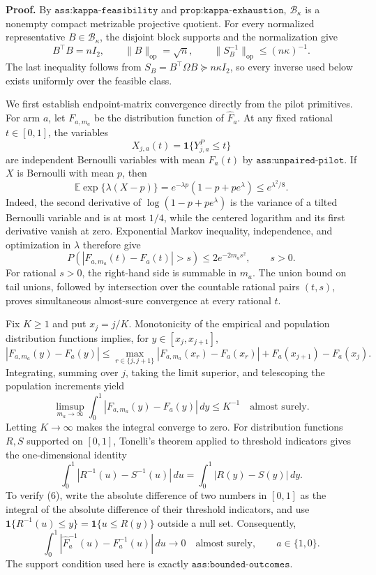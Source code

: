 \textbf{Proof.}
By \(\texttt{ass:kappa-feasibility}\) and \(\texttt{prop:kappa-exhaustion}\), \(\mathcal B_\kappa\) is a nonempty compact metrizable projective quotient.  For every normalized representative \(B\in\mathcal B_\kappa\), the disjoint block supports and the normalization give
\[
B^{\top}B=nI_2,
\qquad
\lVert B\rVert_{\mathrm{op}}=\sqrt n,
\qquad
\lVert S_B^{-1}\rVert_{\mathrm{op}}\le (n\kappa)^{-1}.
\tag{1}
\]
The last inequality follows from \(S_B=B^{\top}\Omega B\succeq n\kappa I_2\), so every inverse used below exists uniformly over the feasible class.

We first establish endpoint-matrix convergence directly from the pilot primitives.  For arm \(a\), let \(F_{a,m_a}\) be the distribution function of \(\widehat F_a\).  At any fixed rational \(t\in[0,1]\), the variables
\[
X_{j,a}(t)=\mathbf 1\{Y^P_{j,a}\le t\}
\]
are independent Bernoulli variables with mean \(F_a(t)\) by \(\texttt{ass:unpaired-pilot}\).  If \(X\) is Bernoulli with mean \(p\), then
\[
\mathbb E\exp\{\lambda(X-p)\}
=e^{-\lambda p}(1-p+pe^\lambda)\le e^{\lambda^2/8}.
\tag{2}
\]
Indeed, the second derivative of \(\log(1-p+pe^\lambda)\) is the variance of a tilted Bernoulli variable and is at most \(1/4\), while the centered logarithm and its first derivative vanish at zero.  Exponential Markov inequality, independence, and optimization in \(\lambda\) therefore give
\[
P\!\left(\left|F_{a,m_a}(t)-F_a(t)\right|>s\right)
\le 2e^{-2m_as^2},
\qquad s>0.
\tag{3}
\]
For rational \(s>0\), the right-hand side is summable in \(m_a\).  The union bound on tail unions, followed by intersection over the countable rational pairs \((t,s)\), proves simultaneous almost-sure convergence at every rational \(t\).

Fix \(K\ge1\) and put \(x_j=j/K\).  Monotonicity of the empirical and population distribution functions implies, for \(y\in[x_j,x_{j+1}]\),
\[
|F_{a,m_a}(y)-F_a(y)|
\le
\max_{r\in\{j,j+1\}}|F_{a,m_a}(x_r)-F_a(x_r)|
+F_a(x_{j+1})-F_a(x_j).
\tag{4}
\]
Integrating, summing over \(j\), taking the limit superior, and telescoping the population increments yield
\[
\limsup_{m_a\to\infty}
\int_0^1|F_{a,m_a}(y)-F_a(y)|\,dy\le K^{-1}
\quad\text{almost surely}.
\tag{5}
\]
Letting \(K\to\infty\) makes the integral converge to zero.  For distribution functions \(R,S\) supported on \([0,1]\), Tonelli's theorem applied to threshold indicators gives the one-dimensional identity
\[
\int_0^1|R^{-1}(u)-S^{-1}(u)|\,du
=\int_0^1|R(y)-S(y)|\,dy.
\tag{6}
\]
To verify (6), write the absolute difference of two numbers in \([0,1]\) as the integral of the absolute difference of their threshold indicators, and use
\(\mathbf 1\{R^{-1}(u)\le y\}=\mathbf 1\{u\le R(y)\}\) outside a null set.  Consequently,
\[
\int_0^1|\widehat F_a^{-1}(u)-F_a^{-1}(u)|\,du\longrightarrow0
\quad\text{almost surely},
\qquad a\in\{1,0\}.
\tag{7}
\]
The support condition used here is exactly \(\texttt{ass:bounded-outcomes}\).

